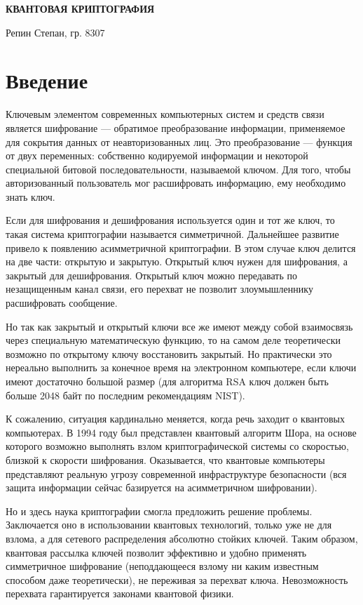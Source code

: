 \documentclass[a4paper,14pt]{extarticle}
\begin{document}
\begin{center}
    \vfill

    \uppercase{\textbf{\large{
        Квантовая криптография
    }}}
\end{center}
\begin{flushright}
Репин Степан, гр. 8307
\end{flushright}
\noindent

\section{Введение}

Ключевым элементом современных компьютерных систем и средств связи является
шифрование --- обратимое преобразование информации, применяемое для сокрытия
данных от неавторизованных лиц. Это преобразование --- функция от двух
переменных: собственно кодируемой информации и некоторой специальной битовой
последовательности, называемой ключом. Для того, чтобы авторизованный
пользователь мог расшифровать информацию, ему необходимо знать ключ.

Если для шифрования и дешифрования используется один и тот же ключ, то такая
система криптографии называется симметричной. Дальнейшее развитие привело к
появлению асимметричной криптографии. В этом случае ключ делится на две
части: открытую и закрытую. Открытый ключ нужен для шифрования, а закрытый для
дешифрования. Открытый ключ можно передавать по незащищенным канал связи, его
перехват не позволит злоумышленнику расшифровать сообщение.

Но так как закрытый и открытый ключи все же имеют между собой взаимосвязь через
специальную математическую функцию, то на самом деле теоретически возможно по
открытому ключу восстановить закрытый. Но практически это нереально выполнить
за конечное время на электронном компьютере, если ключи имеют достаточно
большой размер (для алгоритма RSA ключ должен быть больше 2048 байт по
последним рекомендациям NIST).

К сожалению, ситуация кардинально меняется, когда речь заходит о квантовых
компьютерах. В 1994 году был представлен квантовый алгоритм Шора, на основе
которого возможно выполнять взлом криптографической системы со скоростью,
близкой к скорости шифрования. Оказывается, что квантовые компьютеры
представляют реальную угрозу современной инфраструктуре безопасности (вся
защита информации сейчас базируется на асимметричном шифровании).

Но и здесь наука криптографии смогла предложить решение проблемы. Заключается
оно в использовании квантовых технологий, только уже не для взлома, а для
сетевого распределения абсолютно стойких ключей. Таким образом, квантовая
рассылка ключей позволит эффективно и удобно применять симметричное шифрование
(неподдающееся взлому ни каким известным способом даже теоретически), не
переживая за перехват ключа. Невозможность перехвата гарантируется законами
квантовой физики.
\end{document}
